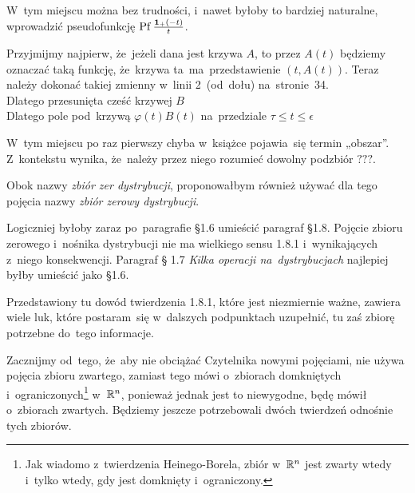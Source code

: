 \documentclass[a4paper,11pt]{article}
\numberwithin{equation}{section}
\begin{document}
\VerSpaceFour





\noindent
{} W~tym miejscu można bez trudności, i~nawet byłoby to
bardziej naturalne, wprowadzić pseudofunkcję
$\operatorname{Pf} \frac{ \mathbf{1}_{ + }( -t )}{ t }$.

\VerSpaceFour





\noindent
{} Przyjmijmy najpierw, że~jeżeli dana jest krzywa
$A$, to przez $A( t )$ będziemy oznaczać taką funkcję, że~krzywa
ta~ma~przedstawienie $( t, A( t ) )$. Teraz należy dokonać takiej
zmienny w~linii 2~(od~dołu) na~stronie~34. \\
\Jest Dlatego przesunięta cześć krzywej $B$ \\
\PowinnoByc Dlatego pole pod~krzywą $\varphi( t ) B( t )$ na~przedziale
$\tau \leq t \leq \epsilon$

\VerSpaceFour





\noindent
{} W~tym miejscu po raz pierwszy chyba w~książce
pojawia~się termin „obszar”. Z~kontekstu wynika, że~należy przez
niego rozumieć dowolny podzbiór $???$.

\VerSpaceFour





\noindent
{} Obok nazwy \textit{zbiór zer dystrybucji}, proponowałbym
również używać dla tego pojęcia nazwy \textit{zbiór zerowy dystrybucji}.

\VerSpaceFour




\noindent
{} Logiczniej byłoby zaraz po~paragrafie \S 1.6 umieścić
paragraf \S 1.8. Pojęcie zbioru zerowego i~nośnika dystrybucji nie ma
wielkiego sensu 1.8.1 i~wynikających z~niego konsekwencji. Paragraf \S
1.7 \textit{Kilka operacji na~dystrybucjach} najlepiej byłby umieścić
jako \S 1.6.

\VerSpaceFour





\noindent
{} Przedstawiony tu dowód twierdzenia 1.8.1, które
jest niezmiernie ważne, zawiera wiele luk, które postaram~się
w~dalszych podpunktach uzupełnić, tu zaś zbiorę potrzebne do~tego
informacje.

Zacznijmy od~tego, że~aby nie obciążać Czytelnika nowymi pojęciami,
nie używa pojęcia zbioru zwartego, zamiast tego mówi o~zbiorach
domkniętych i~ograniczonych\footnote{Jak wiadomo z~twierdzenia
  Heinego-Borela, zbiór w~$\mathbb{R}^{ n }$ jest zwarty wtedy i~tylko
  wtedy, gdy jest domknięty i~ograniczony.} w~$\mathbb{R}^{ n }$, ponieważ jednak
jest to niewygodne, będę mówił o~zbiorach zwartych. Będziemy jeszcze
potrzebowali dwóch twierdzeń odnośnie tych zbiorów.
\end{document}
